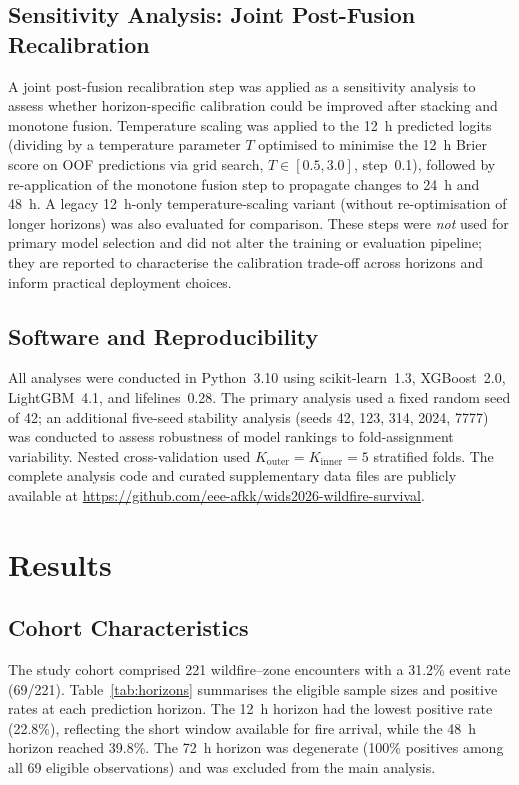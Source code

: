 \documentclass[fire,article,submit,pdftex]{../Definitions/mdpi}
\begin{document}
\subsection{Sensitivity Analysis: Joint Post-Fusion Recalibration}\label{sec:recal}

A joint post-fusion recalibration step was applied as a sensitivity analysis to assess whether horizon-specific calibration could be improved after stacking and monotone fusion.
Temperature scaling was applied to the 12~h predicted logits (dividing by a temperature parameter $T$ optimised to minimise the 12~h Brier score on OOF predictions via grid search, $T \in [0.5, 3.0]$, step~0.1), followed by re-application of the monotone fusion step to propagate changes to 24~h and 48~h.
A legacy 12~h-only temperature-scaling variant (without re-optimisation of longer horizons) was also evaluated for comparison.
These steps were \emph{not} used for primary model selection and did not alter the training or evaluation pipeline; they are reported to characterise the calibration trade-off across horizons and inform practical deployment choices.

\subsection{Software and Reproducibility}\label{sec:software}

All analyses were conducted in Python~3.10 using scikit-learn~1.3, XGBoost~2.0, LightGBM~4.1, and lifelines~0.28.
The primary analysis used a fixed random seed of 42; an additional five-seed stability analysis (seeds 42, 123, 314, 2024, 7777) was conducted to assess robustness of model rankings to fold-assignment variability.
Nested cross-validation used $K_{\text{outer}} = K_{\text{inner}} = 5$ stratified folds.
The complete analysis code and curated supplementary data files are publicly available at \url{https://github.com/eee-afkk/wids2026-wildfire-survival}.

\section{Results}\label{sec:results}

\subsection{Cohort Characteristics}\label{sec:cohort}

The study cohort comprised 221 wildfire--zone encounters with a 31.2\% event rate (69/221).
Table~\ref{tab:horizons} summarises the eligible sample sizes and positive rates at each prediction horizon.
The 12~h horizon had the lowest positive rate (22.8\%), reflecting the short window available for fire arrival, while the 48~h horizon reached 39.8\%.
The 72~h horizon was degenerate (100\% positives among all 69 eligible observations) and was excluded from the main analysis.
\end{document}

